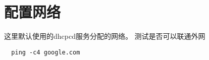 
\chapter{配置网络}
这里默认使用的dhcpcd服务分配的网络。
测试是否可以联通外网
\begin{lstlisting}
  ping -c4 google.com
\end{lstlisting}
